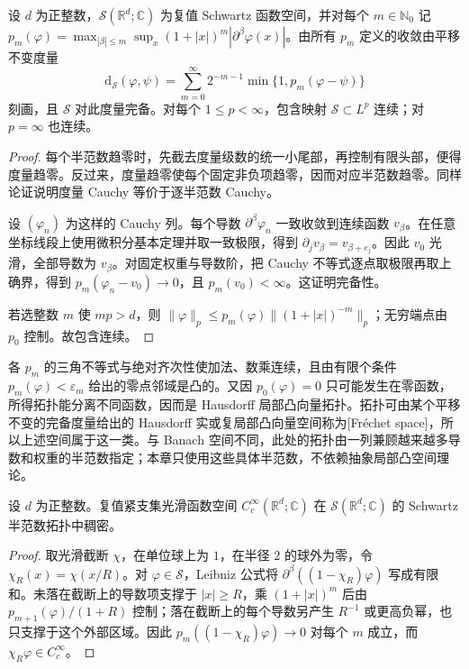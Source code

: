 \begin{proposition}\label{b2:prop:05-schwartz-complete}
设 \(d\) 为正整数，\(\mathcal S(\mathbb R^d;\mathbb C)\) 为复值 Schwartz 函数空间，并对每个 \(m\in\mathbb N_0\) 记 \(p_m(\varphi)=\max_{|\beta|\leq m}\sup_x(1+|x|)^m|\partial^\beta\varphi(x)|\)。由所有 \(p_m\) 定义的收敛由平移不变度量
\[
 \mathrm{d}_{\mathcal S}(\varphi,\psi)
 =\sum_{m=0}^\infty2^{-m-1}\min\{1,p_m(\varphi-\psi)\}
\]
刻画，且 \(\mathcal S\) 对此度量完备。对每个 \(1\leq p<\infty\)，包含映射 \(\mathcal S\subset L^p\) 连续；对 \(p=\infty\) 也连续。
\end{proposition}
\begin{proof}
每个半范数趋零时，先截去度量级数的统一小尾部，再控制有限头部，便得度量趋零。反过来，度量趋零使每个固定非负项趋零，因而对应半范数趋零。同样论证说明度量 Cauchy 等价于逐半范数 Cauchy。

设 \((\varphi_n)\) 为这样的 Cauchy 列。每个导数 \(\partial^\beta\varphi_n\) 一致收敛到连续函数 \(v_\beta\)。在任意坐标线段上使用微积分基本定理并取一致极限，得到 \(\partial_jv_\beta=v_{\beta+e_j}\)。因此 \(v_0\) 光滑，全部导数为 \(v_\beta\)。对固定权重与导数阶，把 Cauchy 不等式逐点取极限再取上确界，得到 \(p_m(\varphi_n-v_0)\to0\)，且 \(p_m(v_0)<\infty\)。这证明完备性。

若选整数 \(m\) 使 \(mp>d\)，则 \(\|\varphi\|_p\leq p_m(\varphi)\|(1+|x|)^{-m}\|_p\)；无穷端点由 \(p_0\) 控制。故包含连续。
\end{proof}

各 \(p_m\) 的三角不等式与绝对齐次性使加法、数乘连续，且由有限个条件 \(p_m(\varphi)<\varepsilon_m\) 给出的零点邻域是凸的。又因 \(p_0(\varphi)=0\) 只可能发生在零函数，所得拓扑能分离不同函数，因而是 Hausdorff 局部凸向量拓扑。拓扑可由某个平移不变的完备度量给出的 Hausdorff 实或复局部凸向量空间称为[Fréchet space]，所以上述空间属于这一类。与 Banach 空间不同，此处的拓扑由一列兼顾越来越多导数和权重的半范数指定；本章只使用这些具体半范数，不依赖抽象局部凸空间理论。

\begin{proposition}\label{b2:prop:05-compact-cutoff}
设 \(d\) 为正整数。复值紧支集光滑函数空间 \(C_c^\infty(\mathbb R^d;\mathbb C)\) 在 \(\mathcal S(\mathbb R^d;\mathbb C)\) 的 Schwartz 半范数拓扑中稠密。
\end{proposition}
\begin{proof}
取光滑截断 \(\chi\)，在单位球上为 \(1\)，在半径 \(2\) 的球外为零，令 \(\chi_R(x)=\chi(x/R)\)。对 \(\varphi\in\mathcal S\)，Leibniz 公式将 \(\partial^\beta((1-\chi_R)\varphi)\) 写成有限和。未落在截断上的导数项支撑于 \(|x|\geq R\)，乘 \((1+|x|)^m\) 后由 \(p_{m+1}(\varphi)/(1+R)\) 控制；落在截断上的每个导数另产生 \(R^{-1}\) 或更高负幂，也只支撑于这个外部区域。因此 \(p_m((1-\chi_R)\varphi)\to0\) 对每个 \(m\) 成立，而 \(\chi_R\varphi\in C_c^\infty\)。
\end{proof}

